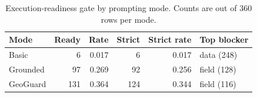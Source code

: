 \begin{table}[htbp]
\centering
\caption{Execution-readiness gate by prompting mode. Counts are out of 360 rows per mode.}
\label{tab:execution-readiness}
\small
\begin{tabular}{lrrrrl}
\toprule
Mode & Ready & Rate & Strict & Strict rate & Top blocker \\
\midrule
Basic & 6 & 0.017 & 6 & 0.017 & data (248) \\
Grounded & 97 & 0.269 & 92 & 0.256 & field (128) \\
GeoGuard & 131 & 0.364 & 124 & 0.344 & field (116) \\
\bottomrule
\end{tabular}
\end{table}
